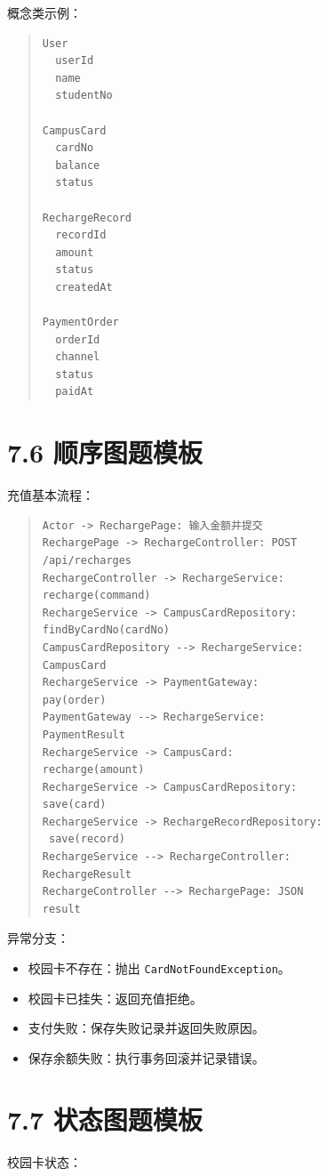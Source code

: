 \documentclass[UTF8,zihao=-4]{ctexart}
\begin{document}
概念类示例：

\begin{quote}
\footnotesize
\begin{verbatim}
User
  userId
  name
  studentNo

CampusCard
  cardNo
  balance
  status

RechargeRecord
  recordId
  amount
  status
  createdAt

PaymentOrder
  orderId
  channel
  status
  paidAt
\end{verbatim}
\end{quote}

\section{7.6 顺序图题模板}

充值基本流程：

\begin{quote}
\footnotesize
\begin{verbatim}
Actor -> RechargePage: 输入金额并提交
RechargePage -> RechargeController: POST 
/api/recharges
RechargeController -> RechargeService: 
recharge(command)
RechargeService -> CampusCardRepository: 
findByCardNo(cardNo)
CampusCardRepository --> RechargeService: 
CampusCard
RechargeService -> PaymentGateway: 
pay(order)
PaymentGateway --> RechargeService: 
PaymentResult
RechargeService -> CampusCard: 
recharge(amount)
RechargeService -> CampusCardRepository: 
save(card)
RechargeService -> RechargeRecordRepository:
 save(record)
RechargeService --> RechargeController: 
RechargeResult
RechargeController --> RechargePage: JSON 
result
\end{verbatim}
\end{quote}

异常分支：

\begin{itemize}
\item 校园卡不存在：抛出 \texttt{CardNotFoundException}。
\item 校园卡已挂失：返回充值拒绝。
\item 支付失败：保存失败记录并返回失败原因。
\item 保存余额失败：执行事务回滚并记录错误。
\end{itemize}

\section{7.7 状态图题模板}

校园卡状态：
\end{document}
